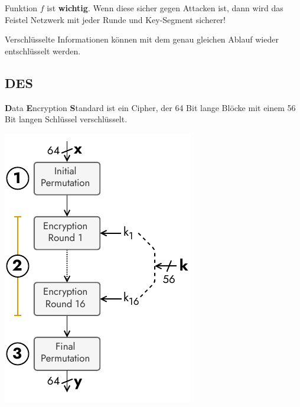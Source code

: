 \documentclass[
  10pt,
  a4paper,
]{article}
\begin{document}
\begin{multicols*}{2}
Funktion \(f\) ist \textbf{wichtig}. Wenn diese sicher gegen Attacken
ist, dann wird das Feistel Netzwerk mit jeder Runde und Key-Segment
sicherer!

\begin{tcolorbox}[enhanced jigsaw, coltitle=black, toprule=.15mm, colframe=quarto-callout-important-color-frame, breakable, titlerule=0mm, title=\textcolor{quarto-callout-important-color}{\faExclamation}\hspace{0.5em}{Ver- \& Entschlüsseln}, toptitle=1mm, colback=white, leftrule=.75mm, bottomtitle=1mm, colbacktitle=quarto-callout-important-color!10!white, left=2mm, bottomrule=.15mm, rightrule=.15mm, arc=.35mm, opacityback=0, opacitybacktitle=0.6]

Verschlüsselte Informationen können mit dem genau gleichen Ablauf wieder
entschlüsselt werden.

\end{tcolorbox}

\subsection{\texorpdfstring{DES
\href{https://www.youtube.com/watch?v=3BZRBfhpIb0}{\color{BrickRed}\faYoutube}}{DES }}\label{des}

\textbf{D}ata \textbf{E}ncryption \textbf{S}tandard ist ein Cipher, der
64 Bit lange Blöcke mit einem 56 Bit langen Schlüssel verschlüsselt.

\begin{center}
\includegraphics{images/crypto/des.pdf}
\end{center}


\end{multicols*}
\end{document}
